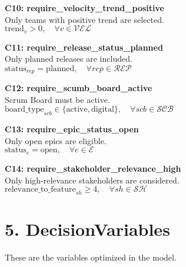\documentclass[12pt]{article}
\begin{document}
    \item \textbf{C10: require\_velocity\_trend\_positive} \\
    Only teams with positive trend are selected. \\
    $ \text{trend}_v > 0, \quad \forall v \in \mathcal{VEL} $

    \item \textbf{C11: require\_release\_status\_planned} \\
    Only planned releases are included. \\
    $ \text{status}_{rep} = \text{planned}, \quad \forall rep \in \mathcal{REP} $

    \item \textbf{C12: require\_scumb\_board\_active} \\
    Scrum Board must be active. \\
    $ \text{board\_type}_{scb} \in \{\text{active}, \text{digital}\}, \quad \forall scb \in \mathcal{SCB} $

    \item \textbf{C13: require\_epic\_status\_open} \\
    Only open epics are eligible. \\
    $ \text{status}_e = \text{open}, \quad \forall e \in \mathcal{E} $

    \item \textbf{C14: require\_stakeholder\_relevance\_high} \\
    Only high-relevance stakeholders are considered. \\
    $ \text{relevance\_to\_feature}_{sh} \geq 4, \quad \forall sh \in \mathcal{SH} $

\section{5. DecisionVariables}

These are the variables optimized in the model.
\end{document}
